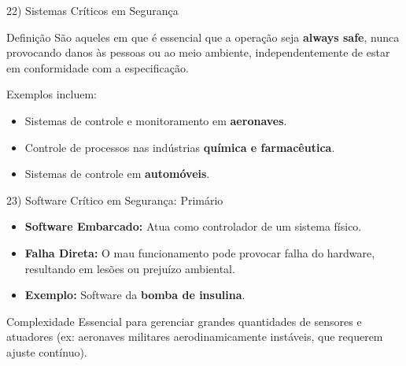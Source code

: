 \documentclass[aspectratio=169]{beamer}
\begin{document}
\begin{frame}{22) Sistemas Críticos em Segurança}
  \begin{block}{Definição}
    São aqueles em que é essencial que a operação seja \textbf{always safe}, nunca provocando danos às pessoas ou ao meio ambiente, independentemente de estar em conformidade com a especificação.
  \end{block}
  \vspace{0.4em}
  Exemplos incluem:
  \begin{itemize}
    \item Sistemas de controle e monitoramento em \textbf{aeronaves}.
    \item Controle de processos nas indústrias \textbf{química e farmacêutica}.
    \item Sistemas de controle em \textbf{automóveis}.
  \end{itemize}
\end{frame}

\begin{frame}{23) Software Crítico em Segurança: Primário}
  \begin{itemize}
    \item \textbf{Software Embarcado:} Atua como controlador de um sistema físico.
    \item \textbf{Falha Direta:} O mau funcionamento pode provocar falha do hardware, resultando em lesões ou prejuízo ambiental.
    \item \textbf{Exemplo:} Software da \textbf{bomba de insulina}.
  \end{itemize}
  \vspace{0.4em}
  \begin{exampleblock}{Complexidade}
    Essencial para gerenciar grandes quantidades de sensores e atuadores (ex: aeronaves militares aerodinamicamente instáveis, que requerem ajuste contínuo).
  \end{exampleblock}
\end{frame}
\end{document}
